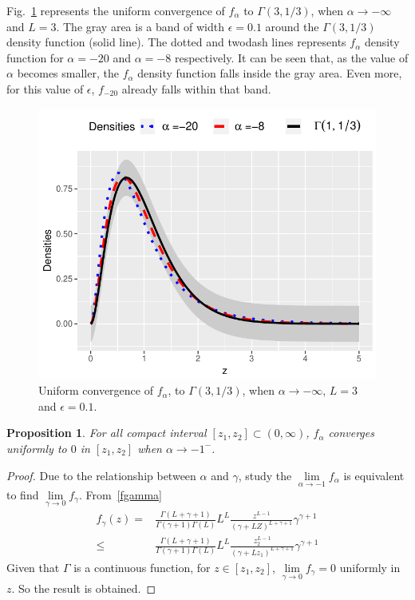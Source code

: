 \documentclass[journal]{IEEEtran}
\newtheorem{proposition}{Proposition}
\numberwithin{equation}{section}
\newenvironment{dem}[1][Proof]{\begin{proof}[{\it #1}]}{\end{proof}}
\newcommand{\pa}[1]{\ensuremath{\left( #1 \right)}}
\begin{document}
Fig.~\ref{ConvInfinito} represents the uniform convergence of $f_{\alpha}$ to $\Gamma(3,1/3)$, when $\alpha \to -\infty$ and $L=3$. The gray area is a band of width $\epsilon=0.1$ around the $\Gamma(3,1/3)$ density function (solid line). The dotted and twodash lines represents $f_{\alpha}$ density function for $\alpha=-20$ and $\alpha=-8$ respectively. It can be seen that, as the value of $\alpha$ becomes smaller, the $f_{\alpha}$ density function falls inside the gray area. Even more, for this value of $\epsilon$, $f_{-20}$ already falls within that band.

\begin{figure}[hbt]
	\centering    
	\includegraphics[width=\linewidth]{../../../Figures/DTTeorico/ConvUniformeMenosInfinito.pdf}
	\caption{\label{ConvInfinito}Uniform convergence of $f_{\alpha}$, to $\Gamma(3,1/3)$, when $\alpha \to -\infty$, $L=3$ and $\epsilon=0.1$.}
\end{figure} 

\begin{proposition}
	For all compact interval $[z_{1},z_{2}]\subset\pa{0,\infty}$, $f_{\alpha}$ converges uniformly to $0$ in $[z_{1},z_{2}]$ when $\alpha\to -1^{-}$.
	\label{pr: convergenciauniforme2}
\end{proposition}
\begin{dem} 
	Due to the relationship between $\alpha$ and $\gamma$, study the $\lim\limits_{\alpha\to-1} f_{\alpha}$ is equivalent to find
	$\lim\limits_{\gamma\to0} f_{\gamma}.$
	From~\ref{fgamma}
	\begin{align*}
	 f_{\gamma}\pa{z} = &\frac{\Gamma\pa{L+\gamma+1}}{\Gamma\pa{\gamma+1}\Gamma\pa{L}}
	L^{L} \frac{z^{L-1}}{(\gamma+LZ)^{L+\gamma+1}} \gamma^{\gamma +1}  \\
	\leq& \frac{\Gamma\pa{L+\gamma+1}}{\Gamma\pa{\gamma+1}\Gamma\pa{L}}
	L^{L} \frac{z_2^{L-1}}{(\gamma+Lz_1)^{L+\gamma+1}} \gamma^{\gamma +1} 
	\end{align*}
	Given that $\Gamma$ is a continuous function, for $z \in [z_{1},z_{2}]$, $\lim\limits_{\gamma\to0} f_{\gamma}=0$ uniformly in $z$. So the result is obtained.
\end{dem}
\end{document}
